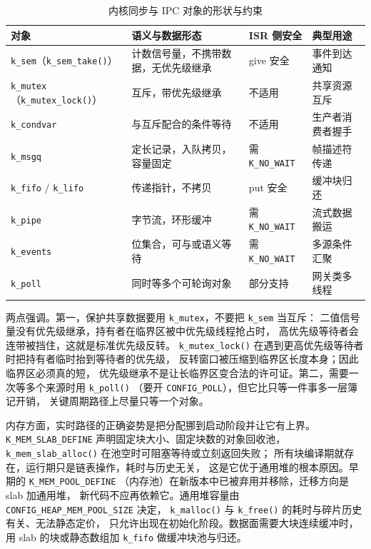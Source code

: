 \documentclass[12pt,a4paper,fontset=fandol]{ctexbook}
\newcommand{\Fn}[1]{\texttt{#1()}}
\newcommand{\Tp}[1]{\texttt{#1}}
\newcommand{\Bk}{\discretionary{}{}{}}
\begin{document}
\begin{table}[htbp]
\centering
\caption{内核同步与 IPC 对象的形状与约束}\label{tab:ch07-sync-ipc}
\begin{tabular}{>{\raggedright\arraybackslash}p{}
                >{\raggedright\arraybackslash}p{}
                >{\raggedright\arraybackslash}p{}
                >{\raggedright\arraybackslash}p{}}
\toprule
对象 & 语义与数据形态 & ISR 侧安全 & 典型用途 \\
\midrule
\Tp{k\_sem}（\Fn{k\_sem\_take}） & 计数信号量，不携带数据，无优先级继承 & give 安全 & 事件到达通知 \\
\Tp{k\_mutex}（\Fn{k\_mutex\_lock}） & 互斥，带优先级继承 & 不适用 & 共享资源互斥 \\
\Tp{k\_condvar} & 与互斥配合的条件等待 & 不适用 & 生产者消费者握手 \\
\Tp{k\_msgq} & 定长记录，入队拷贝，容量固定 & 需 \Tp{K\_NO\_WAIT} & 帧描述符传递 \\
\Tp{k\_fifo} / \Tp{k\_lifo} & 传递指针，不拷贝 & put 安全 & 缓冲块归还 \\
\Tp{k\_pipe} & 字节流，环形缓冲 & 需 \Tp{K\_NO\_WAIT} & 流式数据搬运 \\
\Tp{k\_events} & 位集合，可与或语义等待 & 需 \Tp{K\_NO\_WAIT} & 多源条件汇聚 \\
\Tp{k\_poll} & 同时等多个可轮询对象 & 部分支持 & 网关类多线程 \\
\bottomrule
\end{tabular}
\end{table}

两点强调。第一，保护共享数据要用 \Tp{k\_mutex}，不要把 \Tp{k\_sem} 当互斥：
二值信号量没有优先级继承，持有者在临界区被中优先级线程抢占时，
高优先级等待者会连带被挡住，这就是标准优先级反转。
\Fn{k\_mutex\_lock} 在遇到更高优先级等待者时把持有者临时抬到等待者的优先级，
反转窗口被压缩到临界区长度本身；因此临界区必须真的短，
优先级继承不是让长临界区变合法的许可证。第二，需要一次等多个来源时用 \Fn{k\_poll}
（要开 \Tp{CONFIG\_POLL}），但它比只等一件事多一层簿记开销，
关键周期路径上尽量只等一个对象。

内存方面，实时路径的正确姿势是把分配挪到启动阶段并让它有上界。
\Tp{K\_{\Bk}MEM\_{\Bk}SLAB\_{\Bk}DEFINE} 声明固定块大小、固定块数的对象回收池，
\Fn{k\_{\Bk}mem\_{\Bk}slab\_{\Bk}alloc} 在池空时可阻塞等待或立刻返回失败；
所有块编译期就存在，运行期只是链表操作，耗时与历史无关，
这是它优于通用堆的根本原因。早期的 \Tp{K\_{\Bk}MEM\_{\Bk}POOL\_{\Bk}DEFINE}
（内存池）在新版本中已被弃用并移除，迁移方向是 slab 加通用堆，
新代码不应再依赖它。通用堆容量由 \Tp{CONFIG\_{\Bk}HEAP\_{\Bk}MEM\_{\Bk}POOL\_{\Bk}SIZE} 决定，
\Fn{k\_malloc} 与 \Fn{k\_free} 的耗时与碎片历史有关、无法静态定价，
只允许出现在初始化阶段。数据面需要大块连续缓冲时，
用 slab 的块或静态数组加 \Tp{k\_fifo} 做缓冲块池与归还。
\end{document}
